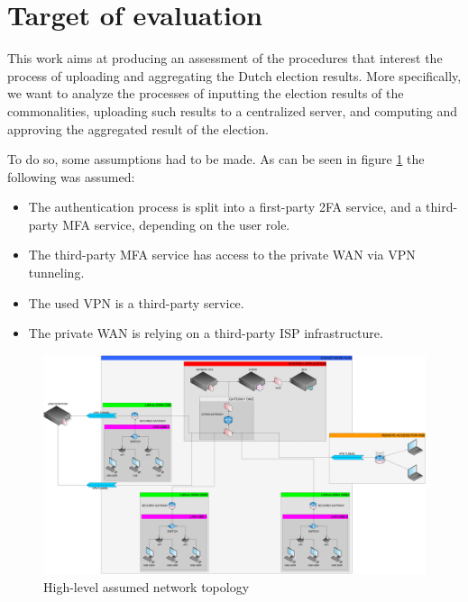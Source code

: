 \chapter*{Target of evaluation} 
\label{target_of_eval}

This work aims at producing an assessment of the procedures that interest the process of uploading and aggregating the Dutch election results. More specifically, we want to analyze the processes of inputting the election results of the commonalities, uploading such results to a centralized server, and computing and approving the aggregated result of the election.

To do so, some assumptions had to be made. As can be seen in figure \ref{fig:map} the following was assumed:

\begin{itemize}
    \item The authentication process is split into a first-party 2FA service, and a third-party MFA service, depending on the user role.
    \item The third-party MFA service has access to the private WAN via VPN tunneling.
    \item The used VPN is a third-party service.
    \item The private WAN is relying on a third-party ISP infrastructure.
\end{itemize}

\begin{figure}[h!]
    \centering
    \includegraphics[keepaspectratio,width=1\textwidth]{01-target/img/map.png}
    \caption{High-level assumed network topology}
    \label{fig:map}
\end{figure}